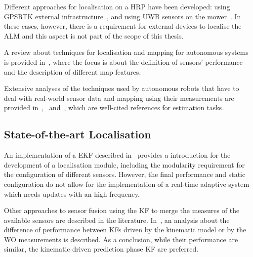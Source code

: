 Different approaches for localisation on a \gls{HRP} have been developed: using \gls{GPSRTK} external infrastructure~\cite{oden_localization_2017}, and using \gls{UWB} sensors on the mower~\cite{lensund_local_2018}.
In these cases, however, there is a requirement for external devices to localise the \gls{ALM} and this aspect is not part of the scope of this thesis.


A review about techniques for localisation and mapping for autonomous systems is provided in~\cite{9065135}, where the focus is about the definition of sensors' performance and the description of different map features.

Extensive analyses of the techniques used by autonomous robots that have to deal with real-world sensor data and mapping using their measurements are provided in~\cite{thrun_probabilistic_2005},~\cite{gustafsson_statistical_2010} and~\cite{mitchell2007multi}, which are well-cited references for estimation tasks.

\subsection{State-of-the-art Localisation}
\noindent An implementation of a \gls{EKF} described in~\cite{moore_generalized_2016} provides a introduction for the development of a localisation module, including the modularity requirement for the configuration of different sensors.
However, the final performance and static configuration do not allow for the implementation of a real-time adaptive system which needs updates with an high frequency.

Other approaches to sensor fusion using the \gls{KF} to merge the measures of the available sensors are described in the literature.
In~\cite{801027}, an analysis about the difference of performance between \glspl{KF} driven by the kinematic model or by the \gls{WO} measurements is described. 
As a conclusion, while their performance are similar, the kinematic driven prediction phase \gls{KF} are preferred.


